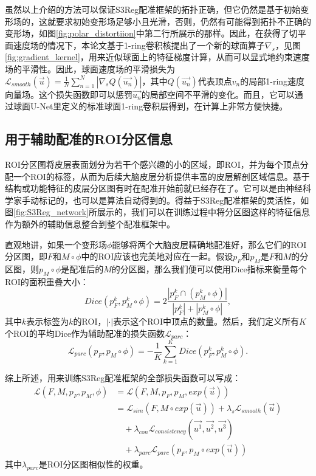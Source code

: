 虽然以上介绍的方法可以保证S3Reg配准框架的拓扑正确，但它仍然是基于初始变形场的，这就要求初始变形场足够小且光滑\cite{yeo2009spherical}，否则，仍然有可能得到拓扑不正确的变形场，如图\ref{fig:polar_distortiion}中第二行所展示的那样。因此，在获得了切平面速度场的情况下，本论文基于1-ring卷积核提出了一个新的球面算子$\nabla_s$，见图\ref{fig:gradient_kernel}，用来近似球面上的特征梯度计算，从而可以显式地约束速度场的平滑性。因此，球面速度场的平滑损失为${\mathcal{L}}_{smooth}(\overrightarrow{u})=\frac{1}{N} \sum_{n=1}^{N} |\nabla_s Q(\overrightarrow{u_n}) | $，其中$Q(\overrightarrow{u_n})$代表顶点$v_n$的局部1-ring速度向量场。这个损失函数即可以惩罚$\overrightarrow{u_n}$的局部空间不平滑的变化。而且，它可以通过球面U-Net里定义的标准球面1-ring卷积层得到，在计算上非常方便快捷。

\subsection{用于辅助配准的ROI分区信息}
ROI分区图将皮层表面划分为若干个感兴趣的小的区域，即ROI，并为每个顶点分配一个ROI的标签，从而为后续大脑皮层分析提供丰富的皮层解剖区域信息。基于结构或功能特征的皮层分区图有时在配准开始前就已经存在了。它可以是由神经科学家手动标记的，也可以是算法自动得到的\cite{zhao2019spherical_isbi}。得益于S3Reg配准框架的灵活性，如图\ref{fig:S3Reg_network}所展示的，我们可以在训练过程中将分区图这样的特征信息作为额外的辅助信息整合到整个配准框架中。

直观地讲，如果一个变形场$\phi$能够将两个大脑皮层精确地配准好，那么它们的ROI分区图，即$F$和$M\circ \phi$中的ROI应该也完美地对应在一起。假设$p_F$和$p_M$是$F$和$M$的分区图，则$p_M\circ \phi$是配准后的$M$的分区图，那么我们便可以使用Dice指标来衡量每个ROI的面积重叠大小：
\begin{equation}\label{eq:Dice}
Dice(p_F^k, p_M^k \circ \phi) = 2 \frac{| p_F^k \cap (p_M^k \circ \phi)|}{|p_F^k| + |p_M^k \circ \phi|},
\end{equation}
其中$k$表示标签为$k$的ROI，$|\cdot|$表示这个ROI中顶点的数量。然后，我们定义所有$K$个ROI的平均Dice作为辅助配准的损失函数${\mathcal{L}}_{parc}$：
\begin{equation}
{\mathcal{L}}_{parc}(p_F,p_M \circ \phi) = -\frac{1}{K} \sum_{k=1}^{K} Dice(p_F^k, p_M^k \circ \phi).
\end{equation}

综上所述，用来训练S3Reg配准框架的全部损失函数可以写成：
\begin{equation}
	\begin{split}
	{\mathcal{L}}(F,M,p_F, p_M,\phi) & = {\mathcal{L}}(F,M,p_F,p_M,exp(\overrightarrow{u})) \\
	& = {\mathcal{L}}_{sim}(F,M\circ exp(\overrightarrow{u})) + \lambda_s {\mathcal{L}}_{smooth}(\overrightarrow{u}) \\
	& \quad + \lambda_{con} {\mathcal{L}}_{consistency}(\overrightarrow{u^1}, \overrightarrow{u^2}, \overrightarrow{u^3}) \\
	& \quad + \lambda_{parc} {\mathcal{L}}_{parc}(p_F,p_M \circ exp(\overrightarrow{u})) 
	\end{split}
\end{equation}
其中$\lambda_{parc}$是ROI分区图相似性的权重。



